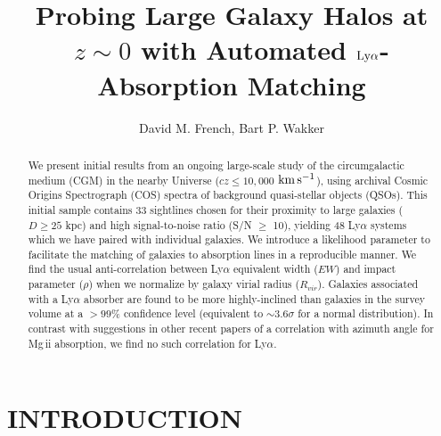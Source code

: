 \documentclass[twocolumn,tighten]{aastex6}
\begin{document}
\title{Probing Large Galaxy Halos at $z\sim0$ with Automated $\rm L \MakeLowercase{y} \alpha$-Absorption Matching}

\author{David M. French, Bart P. Wakker}


\begin{abstract}

We present initial results from an ongoing large-scale study of the circumgalactic medium (CGM) in the nearby Universe ($cz \leq 10,000$ $\rm km\, s^{-1}$), using archival Cosmic Origins Spectrograph (COS) spectra of background quasi-stellar objects (QSOs). This initial sample contains 33 sightlines chosen for their proximity to large galaxies ($D\geq25$ kpc) and high signal-to-noise ratio (S/N $\geq$ 10), yielding 48 Ly$\alpha$ systems which we have paired with individual galaxies. We introduce a likelihood parameter to facilitate the matching of galaxies to absorption lines in a reproducible manner. We find the usual anti-correlation between Ly$\alpha$ equivalent width ($EW$) and impact parameter ($\rho$) when we normalize by galaxy virial radius ($R_{vir}$). Galaxies associated with a Ly$\alpha$ absorber are found to be more highly-inclined than galaxies in the survey volume at a $>99\%$ confidence level (equivalent to $\sim 3.6 \sigma$ for a normal distribution). In contrast with suggestions in other recent papers of a correlation with azimuth angle for Mg\,{\sc ii} absorption, we find no such correlation for Ly$\alpha$.


\end{abstract}




\section{INTRODUCTION}
\end{document}
